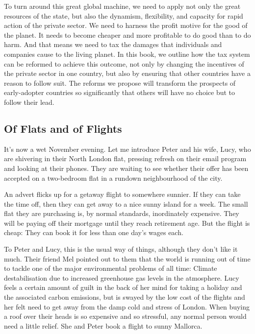 \documentclass[]{tufte-handout}
\begin{document}
To turn around this great global machine, we need to apply not only the
great resources of the state, but also the dynamism, flexibility, and
capacity for rapid action of the private sector. We need to harness the
profit motive for the good of the planet. It needs to become cheaper and
more profitable to do good than to do harm. And that means we need to
tax the damages that individuals and companies cause to the living
planet. In this book, we outline how the tax system can be reformed to
achieve this outcome, not only by changing the incentives of the private
sector in one country, but also by ensuring that other countries have a
reason to follow suit. The reforms we propose will transform the
prospects of early-adopter countries so significantly that others will
have no choice but to follow their lead.

\hypertarget{of-flats-and-of-flights}{%
\subsection{Of Flats and of Flights}\label{of-flats-and-of-flights}}

It's now a wet November evening. Let me introduce Peter and his wife,
Lucy, who are shivering in their North London flat, pressing refresh on
their email program and looking at their phones. They are waiting to see
whether their offer has been accepted on a two-bedroom flat in a rundown
neighbourhood of the city.

An advert flicks up for a getaway flight to somewhere sunnier. If they
can take the time off, then they can get away to a nice sunny island for
a week. The small flat they are purchasing is, by normal standards,
inordinately expensive. They will be paying off their mortgage until
they reach retirement age. But the flight is cheap: They can book it for
less than one day's wages each.

To Peter and Lucy, this is the usual way of things, although they don't
like it much. Their friend Mel pointed out to them that the world is
running out of time to tackle one of the major environmental problems of
all time: Climate destabilisation due to increased greenhouse gas levels
in the atmosphere. Lucy feels a certain amount of guilt in the back of
her mind for taking a holiday and the associated carbon emissions, but
is swayed by the low cost of the flights and her felt need to get away
from the damp cold and stress of London. When buying a roof over their
heads is so expensive and so stressful, any normal person would need a
little relief. She and Peter book a flight to sunny Mallorca.
\end{document}
